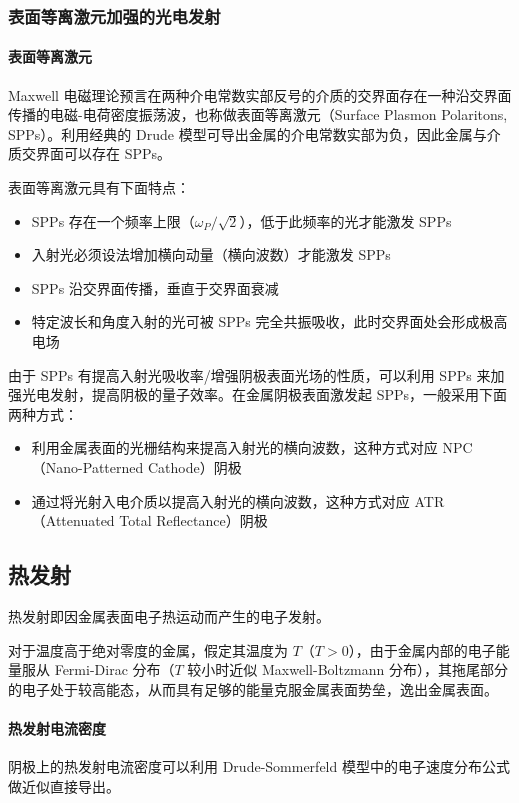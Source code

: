 \subsubsection{表面等离激元加强的光电发射}
	\paragraph{表面等离激元}
	Maxwell 电磁理论预言在两种介电常数实部反号的介质的交界面存在一种沿交界面传播的电磁-电荷密度振荡波，也称做表面等离激元（Surface Plasmon Polaritons, SPPs）。利用经典的 Drude 模型可导出金属的介电常数实部为负，因此金属与介质交界面可以存在 SPPs。
	
	表面等离激元具有下面特点：
	\begin{itemize}
	\item SPPs 存在一个频率上限（$\omega_P/\sqrt{2}$），低于此频率的光才能激发 SPPs
	\item 入射光必须设法增加横向动量（横向波数）才能激发 SPPs
	\item SPPs 沿交界面传播，垂直于交界面衰减
	\item 特定波长和角度入射的光可被 SPPs 完全共振吸收，此时交界面处会形成极高电场
	\end{itemize}
	由于 SPPs 有提高入射光吸收率/增强阴极表面光场的性质，可以利用 SPPs 来加强光电发射，提高阴极的量子效率。在金属阴极表面激发起 SPPs，一般采用下面两种方式：
	\begin{itemize}
	\item 利用金属表面的光栅结构来提高入射光的横向波数，这种方式对应 NPC（Nano-Patterned Cathode）阴极
	\item 通过将光射入电介质以提高入射光的横向波数，这种方式对应 ATR（Attenuated Total Reflectance）阴极
	\end{itemize}

\subsection{热发射}
热发射即因金属表面电子热运动而产生的电子发射。

对于温度高于绝对零度的金属，假定其温度为 $T$（$T > 0$），由于金属内部的电子能量服从 Fermi-Dirac 分布（$T$ 较小时近似 Maxwell-Boltzmann 分布），其拖尾部分的电子处于较高能态，从而具有足够的能量克服金属表面势垒，逸出金属表面。

\paragraph{热发射电流密度}
	阴极上的热发射电流密度可以利用 Drude-Sommerfeld 模型中的电子速度分布公式做近似直接导出。
	
